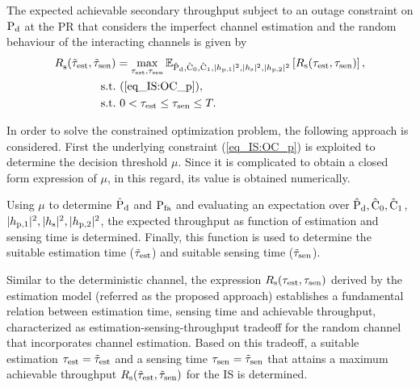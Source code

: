 \begin{theorem} \label{th_IS:th4}
\normalfont
The expected achievable secondary throughput subject to an outage constraint on $\text{P}_{\text{d}}$ at the PR that considers the imperfect channel estimation and the random behaviour of the interacting channels is given by
\begin{align}
{R}_{\text{s}}^{\text{}}(\tilde{\tau}_{\text{est}}, \tilde{\tau}_{\text{sen}}) &= \operatorname*{max}_{\tau_{\text{est}}, \tau_{\text{sen}}} {\mathbb E}_{\hat{\text{P}}_{\text{d}}, \hat{\text{C}}_{\text{0}}, \hat{\text{C}}_{\text{1}}, |h_{\text{p,1}}|^2, |h_{\text{s}}|^2, |h_{\text{p,2}}|^2}\left[ R_{\text{s}}(\tau_{\text{est}}, \tau_{\text{sen}}) \right], \nonumber \\ 
\text{s.t.} & \text{ }  (\ref{eq_IS:OC_p}),  \\
\text{s.t.} & \text{ }  0 < \tau_{\text{est}} \le \tau_{\text{sen}} \le T. \nonumber
\end{align}
\end{theorem}

\begin{IEEEproof}[Solution]
In order to solve the constrained optimization problem, the following approach is considered. First the underlying constraint (\ref{eq_IS:OC_p}) is exploited to determine the decision threshold $\mu$. Since it is complicated to obtain a closed form expression of $\mu$, in this regard, its value is obtained numerically.

Using $\mu$ to determine $\hat{\text{P}}_{\text{d}}$ and $\text{P}_{\text{fa}}$ and evaluating an expectation over $\hat{\text{P}}_{\text{d}}, \hat{\text{C}}_{\text{0}}, \hat{\text{C}}_{\text{1}}$, $|h_{\text{p,1}}|^2, |h_{\text{s}}|^2, |h_{\text{p,2}}|^2$, the expected throughput as function of estimation and sensing time is determined. Finally, this function is used to determine the suitable estimation time ($\tilde{\tau}_{\text{est}}$) and suitable sensing time ($\tilde{\tau}_{\text{sen}}$).
\end{IEEEproof}


\begin{remark} \label{rem_IS:rem4}
\normalfont
Similar to the deterministic channel, the expression $R_{\text{s}}(\tau_{\text{est}}, \tau_{\text{sen}})$ derived by the estimation model (referred as the proposed approach) establishes a fundamental relation between estimation time, sensing time and achievable throughput, characterized as estimation-sensing-throughput tradeoff for the random channel that incorporates channel estimation. Based on this tradeoff, a suitable estimation $\tau_{\text{est}} = \tilde{\tau}_{\text{est}}$ and a sensing time $\tau_{\text{sen}} = \tilde{\tau}_{\text{sen}}$ that attains a maximum achievable throughput $R_{\text{s}}(\tilde{\tau}_{\text{est}},\tilde{\tau}_{\text{sen}})$ for the IS is determined.
\end{remark}


